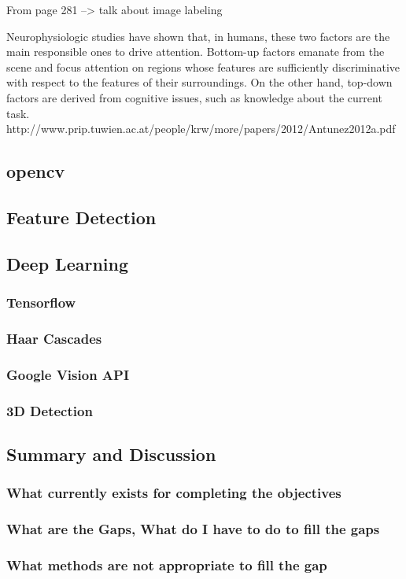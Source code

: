 \documentclass{mproj}
\begin{document}
From page 281 --> talk about image labeling

Neurophysiologic studies have shown that, in humans, these two 
factors are the main responsible ones to drive attention. Bottom-up factors emanate from the scene and 
focus attention on regions whose features are sufficiently discriminative with respect to the features 
of their surroundings. On the other hand, top-down factors are derived from cognitive issues, such as 
knowledge about the current task.
http://www.prip.tuwien.ac.at/people/krw/more/papers/2012/Antunez2012a.pdf

\subsection{opencv}
\subsection{Feature Detection}
\subsection{Deep Learning}
\subsubsection{Tensorflow}
\subsubsection{Haar Cascades}
\subsubsection{Google Vision API}
\subsubsection{3D Detection}
\subsection{Summary and Discussion}
\subsubsection{What currently exists for completing the objectives}
\subsubsection{What are the Gaps, What do I have to do to fill the gaps}
\subsubsection{What methods are not appropriate to fill the gap}
\end{document}
